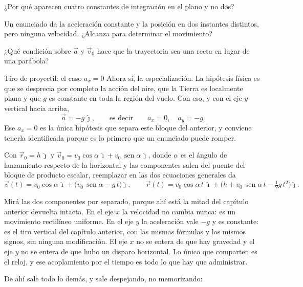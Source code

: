\documentclass[11pt,openany]{book}
\newcommand{\sen}{\operatorname{sen}}
\begin{document}
\begin{chequeo}
\item ¿Por qué aparecen cuatro constantes de integración en el plano y no dos?
\item Un enunciado da la aceleración constante y la posición en dos instantes distintos, pero ninguna velocidad. ¿Alcanza para determinar el movimiento?
\item ¿Qué condición sobre $\vec a$ y $\vec v_0$ hace que la trayectoria sea una recta en lugar de una parábola?
\end{chequeo}

\begin{bloque}{Tiro de proyectil: el caso $a_x = 0$}
Ahora sí, la especialización. La hipótesis física es que se desprecia por completo la acción del aire, que la Tierra es localmente plana y que $g$ es constante en toda la región del vuelo. Con eso, y con el eje $y$ vertical hacia arriba,
\[
\vec a = -g\,\hat\jmath, \qquad\text{es decir}\qquad a_x = 0,\quad a_y = -g.
\]
Ese $a_x = 0$ es la única hipótesis que separa este bloque del anterior, y conviene tenerla identificada porque es lo primero que un enunciado puede romper.

Con $\vec r_0 = h\,\hat\jmath$ y $\vec v_0 = v_0\cos\alpha\,\hat\imath + v_0\,\sen\alpha\,\hat\jmath$, donde $\alpha$ es el ángulo de lanzamiento respecto de la horizontal y las componentes salen del puente del bloque de producto escalar, reemplazar en las dos ecuaciones generales da
\[
\vec v(t) = v_0\cos\alpha\,\hat\imath + \big(v_0\,\sen\alpha - g\,t\big)\hat\jmath,
\qquad
\vec r(t) = v_0\cos\alpha\,t\;\hat\imath + \Big(h + v_0\,\sen\alpha\,t - \tfrac12 g\,t^2\Big)\hat\jmath.
\]

Mirá las dos componentes por separado, porque ahí está la mitad del capítulo anterior devuelta intacta. En el eje $x$ la velocidad no cambia nunca: es un movimiento rectilíneo uniforme. En el eje $y$ la aceleración vale $-g$ y es constante: es el tiro vertical del capítulo anterior, con las mismas fórmulas y los mismos signos, sin ninguna modificación. El eje $x$ no se entera de que hay gravedad y el eje $y$ no se entera de que hubo un disparo horizontal. Lo único que comparten es el reloj, y ese acoplamiento por el tiempo es todo lo que hay que administrar.

De ahí sale todo lo demás, y sale despejando, no memorizando:


\end{bloque}
\end{document}
